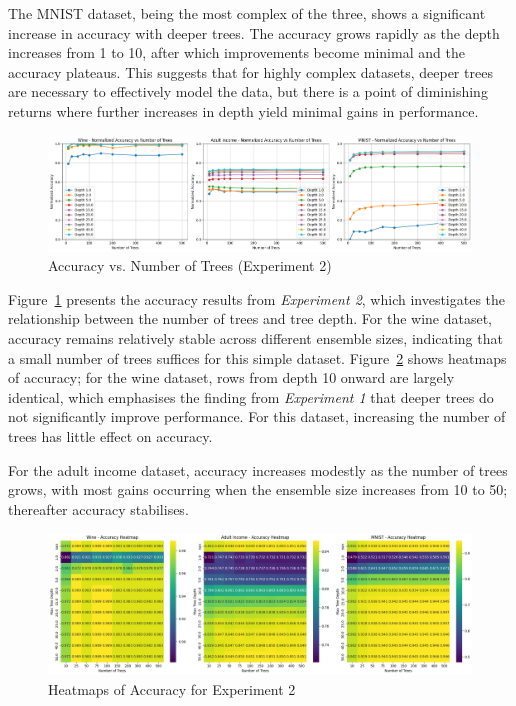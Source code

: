 \documentclass[conference]{IEEEtran}
\begin{document}
The MNIST dataset, being the most complex of the three, shows a significant increase in accuracy with deeper trees. The accuracy grows rapidly as the depth increases from 1 to 10, after which improvements become minimal and the accuracy plateaus. This suggests that for highly complex datasets, deeper trees are necessary to effectively model the data, but there is a point of diminishing returns where further increases in depth yield minimal gains in performance.

\begin{figure}[htbp]
    \centering
    \includegraphics[width=\textwidth]{figures/line_plot_exp_2.png}
    \caption{Accuracy vs. Number of Trees (Experiment 2)}
    \label{fig:accuracy_vs_trees_exp_2}
\end{figure}

Figure~\ref{fig:accuracy_vs_trees_exp_2} presents the accuracy results from \textit{Experiment 2}, which investigates the relationship between the number of trees and tree depth. For the wine dataset, accuracy remains relatively stable across different ensemble sizes, indicating that a small number of trees suffices for this simple dataset. Figure~\ref{fig:heatmaps_exp_2} shows heatmaps of accuracy; for the wine dataset, rows from depth 10 onward are largely identical, which emphasises the finding from \textit{Experiment 1} that deeper trees do not significantly improve performance. For this dataset, increasing the number of trees has little effect on accuracy.

For the adult income dataset, accuracy increases modestly as the number of trees grows, with most gains occurring when the ensemble size increases from 10 to 50; thereafter accuracy stabilises.

\begin{figure}[htbp]
    \centering
    \includegraphics[width=\textwidth]{figures/heatmaps_exp_2.png}
    \caption{Heatmaps of Accuracy for Experiment 2}
    \label{fig:heatmaps_exp_2}
\end{figure}
\end{document}
